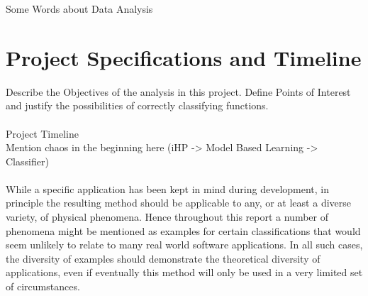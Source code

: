 \documentclass[main.tex]{subfiles}
\begin{document}
  
  Some Words about Data Analysis
  
  \section{Project Specifications and Timeline}
    Describe the Objectives of the analysis in this project. Define Points of Interest and justify the possibilities of correctly classifying functions.
    \\\\
    Project Timeline \\
    Mention chaos in the beginning here (iHP -> Model Based Learning -> Classifier)
    \\\\
    While a specific application has been kept in mind during development, in principle the resulting method should be applicable to any, or at least a diverse variety, of physical phenomena. Hence throughout this report a number of phenomena might be mentioned as examples for certain classifications that would seem unlikely to relate to many real world software applications. In all such cases, the diversity of examples should demonstrate the theoretical diversity of applications, even if eventually this method will only be used in a very limited set of circumstances.
    
\end{document}
